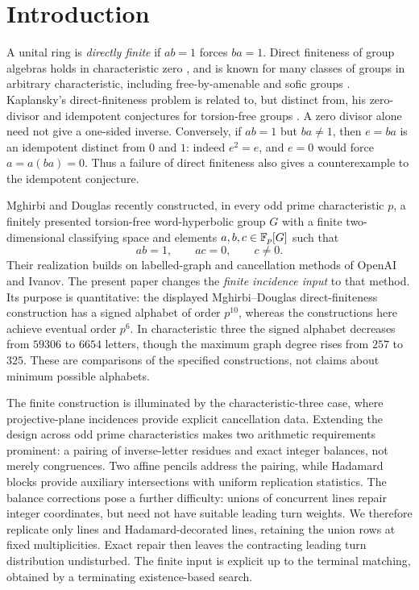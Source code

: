 \section{Introduction}
A unital ring is \emph{directly finite} if $ab=1$ forces $ba=1$. Direct finiteness of group algebras holds in characteristic zero \cite{Mon69}, and is known for many classes of groups in arbitrary characteristic, including free-by-amenable and sofic groups \cite{AOP02,ES04}. Kaplansky's direct-finiteness problem is related to, but distinct from, his zero-divisor and idempotent conjectures for torsion-free groups \cite{Kap72}. A zero divisor alone need not give a one-sided inverse. Conversely, if $ab=1$ but $ba\ne1$, then $e=ba$ is an idempotent distinct from $0$ and $1$: indeed $e^2=e$, and $e=0$ would force $a=a(ba)=0$. Thus a failure of direct finiteness also gives a counterexample to the idempotent conjecture.

Mghirbi and Douglas \cite[Theorem C]{MD26} recently constructed, in every odd prime characteristic $p$, a finitely presented torsion-free word-hyperbolic group $G$ with a finite two-dimensional classifying space and elements $a,b,c\in\mathbb F_p[G]$ such that
\begin{equation}\label{eq:headline-algebra}
 ab=1,\qquad ac=0,\qquad c\ne0.
\end{equation}
Their realization builds on labelled-graph and cancellation methods of OpenAI and Ivanov. The present paper changes the \emph{finite incidence input} to that method. Its purpose is quantitative: the displayed Mghirbi--Douglas direct-finiteness construction has a signed alphabet of order $p^{10}$, whereas the constructions here achieve eventual order $p^6$. In characteristic three the signed alphabet decreases from $59306$ to $6654$ letters, though the maximum graph degree rises from $257$ to $325$. These are comparisons of the specified constructions, not claims about minimum possible alphabets.

The finite construction is illuminated by the characteristic-three case, where projective-plane incidences provide explicit cancellation data. Extending the design across odd prime characteristics makes two arithmetic requirements prominent: a pairing of inverse-letter residues and exact integer balances, not merely congruences. Two affine pencils address the pairing, while Hadamard blocks provide auxiliary intersections with uniform replication statistics. The balance corrections pose a further difficulty: unions of concurrent lines repair integer coordinates, but need not have suitable leading turn weights. We therefore replicate only lines and Hadamard-decorated lines, retaining the union rows at fixed multiplicities. Exact repair then leaves the contracting leading turn distribution undisturbed. The finite input is explicit up to the terminal matching, obtained by a terminating existence-based search.

